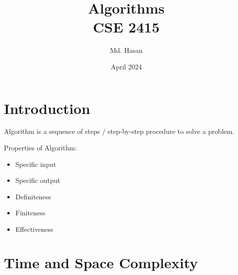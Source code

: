 \documentclass{article}
\title{Algorithms \\ CSE 2415}
\author{Md. Hasan}
\date{April 2024}
\begin{document}
\maketitle
\newpage

\section*{Introduction}

Algorithm is a sequence of steps / step-by-step procedure to solve a problem.

\vspace*{20pt}

Properties of Algorithm:

\begin{itemize}
    \item Specific input
    \item Specific output
    \item Definiteness
    \item Finiteness
    \item Effectiveness
\end{itemize}

\section*{Time and Space Complexity}
\end{document}
